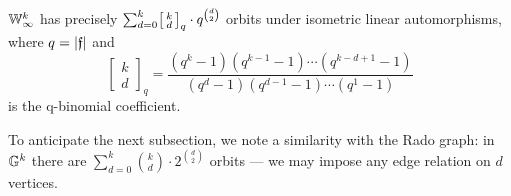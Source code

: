 \begin{proposition}\label{prop:symplectic-oligomorphic}
    $\mathbb{W}_\infty^k$ has precisely \(
        \sum_{d = 0}^k \begin{bsmallmatrix}k \\ d \end{bsmallmatrix}_q \cdot q^{\binom{d}{2}}
    \) orbits under isometric linear automorphisms,
    where $q = \vert \mathfrak{f} \vert$ and \[
        \begin{bmatrix}k \\ d \end{bmatrix}_q 
        = \frac{
            (q^k - 1)(q^{k-1} - 1) \cdots (q^{k-d+1} - 1)
        }{
            (q^d - 1) (q^{d-1} - 1) \cdots (q^1 - 1)
        }
    \] is the q-binomial coefficient.
\end{proposition}
\begin{remark}
    To anticipate the next subsection, we note a similarity with the Rado graph: 
    in $\mathbb{G}^k$ there are $\sum_{d=0}^k \binom{k}{d} \cdot 2^{\binom{d}{2}}$ orbits 
    --- we may impose any edge relation on $d$ vertices.
\end{remark}

